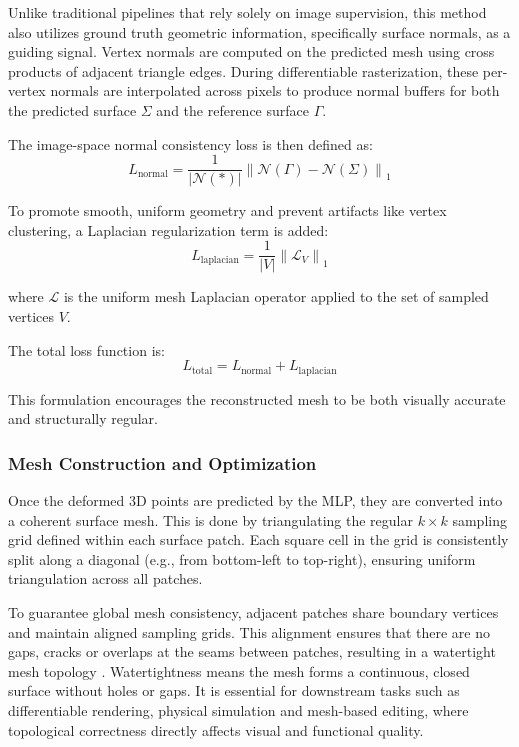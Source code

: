 Unlike traditional pipelines that rely solely on image supervision, this method also utilizes ground truth geometric information, specifically surface normals, as a guiding signal.
Vertex normals are computed on the predicted mesh using cross products of adjacent triangle edges.
During differentiable rasterization, these per-vertex normals are interpolated across pixels to produce normal buffers for both the predicted surface $\Sigma$ and the reference surface $\Gamma$.

The image-space normal consistency loss is then defined as:
\[
L_{\text{normal}} = \frac{1}{|\mathcal{N}(*)|} \left\| \mathcal{N}(\Gamma) - \mathcal{N}(\Sigma) \right\|_1
\]

To promote smooth, uniform geometry and prevent artifacts like vertex clustering, a Laplacian regularization term is added:
\[
L_{\text{laplacian}} = \frac{1}{|V|} \left\| \mathcal{L}_V \right\|_1
\]

where $\mathcal{L}$ is the uniform mesh Laplacian operator applied to the set of sampled vertices $V$.

The total loss function is:
\[
L_{\text{total}} = L_{\text{normal}} + L_{\text{laplacian}}
\]

This formulation encourages the reconstructed mesh to be both visually accurate and structurally regular.

\subsubsection{Mesh Construction and Optimization}

Once the deformed 3D points are predicted by the MLP, they are converted into a coherent surface mesh.
This is done by triangulating the regular $k \times k$ sampling grid defined within each surface patch.
Each square cell in the grid is consistently split along a diagonal (e.g., from bottom-left to top-right), ensuring uniform triangulation across all patches.

To guarantee global mesh consistency, adjacent patches share boundary vertices and maintain aligned sampling grids.
This alignment ensures that there are no gaps, cracks or overlaps at the seams between patches, resulting in a watertight mesh topology \cite{sivaram2024}.
Watertightness means the mesh forms a continuous, closed surface without holes or gaps. It is essential for downstream tasks such as differentiable rendering, physical simulation and mesh-based editing, where topological correctness directly affects visual and functional quality.

